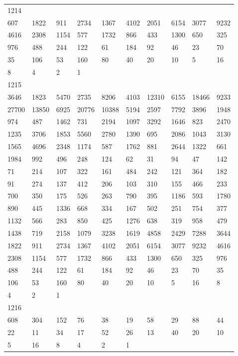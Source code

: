 \begin{longtable}{*{10}{l}}
1214&&&&&&&&&\\
607& 1822& 911& 2734& 1367& 4102& 2051& 6154& 3077& 9232\\
4616& 2308& 1154& 577& 1732& 866& 433& 1300& 650& 325\\
976& 488& 244& 122& 61& 184& 92& 46& 23& 70\\
35& 106& 53& 160& 80& 40& 20& 10& 5& 16\\
8& 4& 2& 1& \\

1215&&&&&&&&&\\
3646& 1823& 5470& 2735& 8206& 4103& 12310& 6155& 18466& 9233\\
27700& 13850& 6925& 20776& 10388& 5194& 2597& 7792& 3896& 1948\\
974& 487& 1462& 731& 2194& 1097& 3292& 1646& 823& 2470\\
1235& 3706& 1853& 5560& 2780& 1390& 695& 2086& 1043& 3130\\
1565& 4696& 2348& 1174& 587& 1762& 881& 2644& 1322& 661\\
1984& 992& 496& 248& 124& 62& 31& 94& 47& 142\\
71& 214& 107& 322& 161& 484& 242& 121& 364& 182\\
91& 274& 137& 412& 206& 103& 310& 155& 466& 233\\
700& 350& 175& 526& 263& 790& 395& 1186& 593& 1780\\
890& 445& 1336& 668& 334& 167& 502& 251& 754& 377\\
1132& 566& 283& 850& 425& 1276& 638& 319& 958& 479\\
1438& 719& 2158& 1079& 3238& 1619& 4858& 2429& 7288& 3644\\
1822& 911& 2734& 1367& 4102& 2051& 6154& 3077& 9232& 4616\\
2308& 1154& 577& 1732& 866& 433& 1300& 650& 325& 976\\
488& 244& 122& 61& 184& 92& 46& 23& 70& 35\\
106& 53& 160& 80& 40& 20& 10& 5& 16& 8\\
4& 2& 1& \\

1216&&&&&&&&&\\
608& 304& 152& 76& 38& 19& 58& 29& 88& 44\\
22& 11& 34& 17& 52& 26& 13& 40& 20& 10\\
5& 16& 8& 4& 2& 1& \\


\end{longtable}
